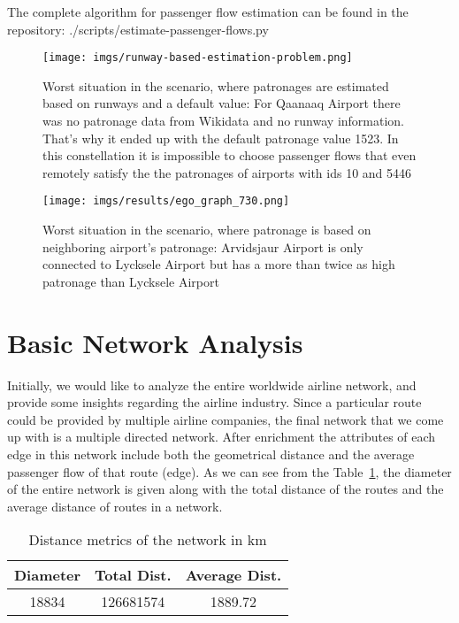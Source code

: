 \documentclass[twocolumn]{tum-article}
\begin{document}
The complete algorithm for passenger flow estimation can be found in the repository: ./scripts/estimate-passenger-flows.py

\begin{figure}[h]
	\centering
	\texttt{[image: imgs/runway-based-estimation-problem.png]}
	\caption{Worst situation in the scenario, where patronages are estimated based on runways and a default value: 
For Qaanaaq Airport there was no patronage data from Wikidata and no runway information. That's why it ended up with the default patronage value 1523. In this constellation it is impossible to choose passenger flows that even remotely satisfy the the patronages of airports with ids 10 and 5446}
	\label{fig:impossible_flows}
\end{figure}

\begin{figure}[h]

	\centering
	\texttt{[image: imgs/results/ego\_graph\_730.png]}
	\caption{Worst situation in the scenario, where patronage is based on neighboring airport's patronage: 
Arvidsjaur Airport is only connected to Lycksele Airport but has a more than twice as high patronage than Lycksele Airport}
	\label{fig:worst_flow_fit}
\end{figure}



\section{Basic Network Analysis}
Initially, we would like to analyze the entire worldwide airline network, and provide some insights regarding the airline industry.
Since a particular route could be provided by multiple airline companies, the final network that we come up with is a multiple directed network.
After enrichment the attributes of each edge in this network include both the geometrical distance and the average passenger flow of that route (edge). 
As we can see from the Table~\ref{Tab:distance_metrics}, the diameter of the entire network is given along with the total distance of the routes and the average distance of routes in a network.  

\begin{table}[ht]	
\begin{center}
 \begin{tabular}{| c | c | c |}
 \hline
 \textbf{Diameter} & \textbf{Total Dist.} & \textbf{Average Dist.} \\ 
 \hline
 18834 & 126681574 & 1889.72 \\
 \hline
 \end{tabular}
\caption{Distance metrics of the network in km}
\label{Tab:distance_metrics}	 
\end{center}
\end{table}
\end{document}

